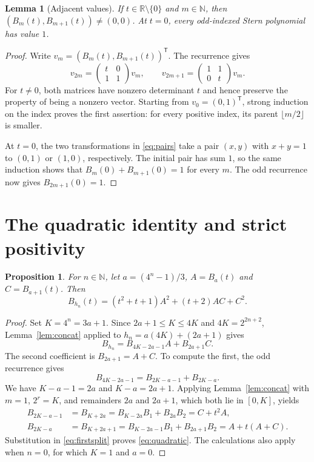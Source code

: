 \documentclass[11pt]{article}
\newtheorem{lemma}[theorem]{Lemma}
\newtheorem{proposition}[theorem]{Proposition}
\theoremstyle{remark}
\newcommand{\N}{\mathbb{N}}
\newcommand{\R}{\mathbb{R}}
\begin{document}
\begin{lemma}[Adjacent values]\label{lem:adjacent}
If $t\in\R\setminus\{0\}$ and $m\in\N$, then
$(B_m(t),B_{m+1}(t))\neq(0,0)$. At $t=0$, every odd-indexed Stern
polynomial has value $1$.
\end{lemma}
\begin{proof}
Write $v_m=(B_m(t),B_{m+1}(t))^{\mathsf T}$. The recurrence gives
\begin{equation}\label{eq:pairs}
 v_{2m}=\begin{pmatrix}t&0\\1&1\end{pmatrix}v_m,
 \qquad
 v_{2m+1}=\begin{pmatrix}1&1\\0&t\end{pmatrix}v_m.
\end{equation}
For $t\neq0$, both matrices have nonzero determinant $t$ and hence
preserve the property of being a nonzero vector. Starting from
$v_0=(0,1)^{\mathsf T}$, strong induction on the index proves the
first assertion: for every positive index, its parent $\lfloor m/2\rfloor$
is smaller.

At $t=0$, the two transformations in \eqref{eq:pairs} take a pair
$(x,y)$ with $x+y=1$ to $(0,1)$ or $(1,0)$, respectively.
The initial pair has sum $1$, so the same induction shows that
$B_m(0)+B_{m+1}(0)=1$ for every $m$. The odd recurrence now gives
$B_{2m+1}(0)=1$.
\end{proof}

\section{The quadratic identity and strict positivity}

\begin{proposition}\label{prop:quadratic}
For $n\in\N$, let $a=(4^n-1)/3$, $A=B_a(t)$ and $C=B_{a+1}(t)$.
Then
\begin{equation}\label{eq:quadratic}
 B_{h_n}(t)=(t^2+t+1)A^2+(t+2)AC+C^2.
\end{equation}
\end{proposition}
\begin{proof}
Set $K=4^n=3a+1$. Since $2a+1\leq K\leq4K$ and
$4K=2^{2n+2}$, Lemma~\ref{lem:concat} applied to
$h_n=a(4K)+(2a+1)$ gives
\begin{equation}\label{eq:firstsplit}
 B_{h_n}=B_{4K-2a-1}A+B_{2a+1}C.
\end{equation}
The second coefficient is $B_{2a+1}=A+C$. To compute the first,
the odd recurrence gives
\[
 B_{4K-2a-1}=B_{2K-a-1}+B_{2K-a}.
\]
We have $K-a-1=2a$ and $K-a=2a+1$. Applying
Lemma~\ref{lem:concat} with $m=1$, $2^r=K$, and remainders
$2a$ and $2a+1$, which both lie in $[0,K]$, yields
\begin{align*}
 B_{2K-a-1}
 &=B_{K+2a}=B_{K-2a}B_1+B_{2a}B_2
   =C+t^2A,\\
 B_{2K-a}
 &=B_{K+2a+1}=B_{K-2a-1}B_1+B_{2a+1}B_2
   =A+t(A+C).
\end{align*}
Substitution in \eqref{eq:firstsplit} proves \eqref{eq:quadratic}.
The calculations also apply when $n=0$, for which $K=1$ and $a=0$.
\end{proof}
\end{document}

